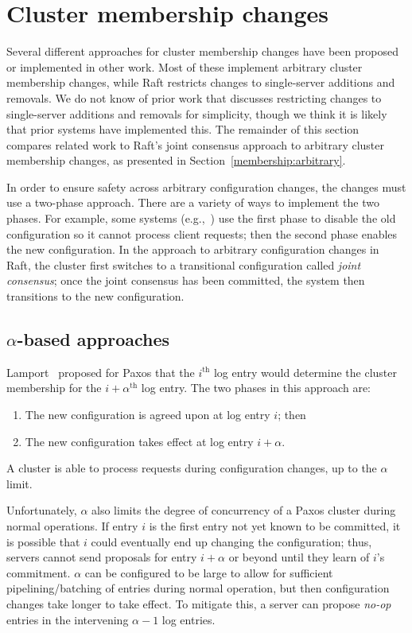 \section{Cluster membership changes}
\label{related:membership}

Several different approaches for cluster membership changes have been
proposed or implemented in other work. Most of these implement arbitrary
cluster membership changes, while Raft restricts changes to
single-server additions and removals.
We do not know of prior work that discusses
restricting changes to single-server additions and removals for
simplicity, though we think it is likely that prior systems have
implemented this. The remainder of this section compares related work to Raft's
joint consensus approach to arbitrary cluster membership changes, as
presented in Section~\ref{membership:arbitrary}.

In order to ensure safety across arbitrary configuration changes, the
changes must use a two-phase approach. There are a variety of ways to
implement the two phases. For example, some systems
(e.g.,~\cite{Liskov:2012}) use the first phase to disable the old
configuration so it cannot process client requests; then the second
phase enables the new configuration. In the approach to arbitrary
configuration changes in Raft, the cluster first switches to a
transitional configuration called \emph{joint consensus}; once the
joint consensus has been committed, the system then transitions to the
new configuration.

\subsection{$\alpha$-based approaches}

Lamport~\cite{Lamport:1998,Lamport:2001} proposed for Paxos that the
$i^\textrm{th}$ log entry would determine the cluster membership for the
$i+\alpha^\textrm{th}$ log entry. The two phases in this approach are:
%
\begin{enumerate}
%
\item The new configuration is agreed upon at log entry $i$; then
%
\item The new configuration takes effect at log entry $i+\alpha$.
%
\end{enumerate}
A cluster is able to process requests during configuration changes, up
to the $\alpha$ limit.

Unfortunately, $\alpha$ also limits the degree of concurrency of a Paxos
cluster during normal operations. If entry $i$ is the first entry not
yet known to be committed, it is possible that $i$ could eventually end
up changing the configuration; thus, servers cannot send proposals for
entry $i+\alpha$ or beyond until they learn of $i$'s commitment.
$\alpha$ can be configured to be large to allow for sufficient
pipelining/batching of entries during normal operation, but then configuration
changes take longer to take effect. To mitigate this, a server can
propose \emph{no-op} entries in the intervening $\alpha - 1$ log
entries.

